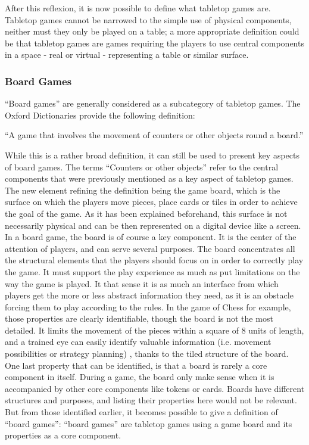 After this reflexion, it is now possible to define what tabletop games are. Tabletop games cannot be narrowed to the simple use of physical components, neither must they only be played on a table; a more appropriate definition could be that tabletop games are games requiring the players to use central components in a space - real or virtual - representing a table or similar surface.

\subsubsection{Board Games}

“Board games” are generally considered as a subcategory of tabletop games. The Oxford Dictionaries provide the following definition:

“A game that involves the movement of counters or other objects round a board.”

While this is a rather broad definition, it can still be used to present key aspects of board games. The terms “Counters or other objects” refer to the central components that were previously mentioned as a key aspect of tabletop games. The new element refining the definition being the game board, which is the surface on which the players move pieces, place cards or tiles in order to achieve the goal of the game. As it has been explained beforehand, this surface is not necessarily physical and can be then represented on a digital device like a screen. In a board game, the board is of course a key component. It is the center of the attention of players, and can serve several purposes. 
The board concentrates all the structural elements that the players should focus on in order to correctly play the game. It must support the play experience as much as put limitations on the way the game is played. It that sense it is as much an interface from which players get the more or less abstract information they need, as it is an obstacle forcing them to play according to the rules. In the game of Chess for example, those properties are clearly identifiable, though the board is not the most detailed. It limits the movement of the pieces within a square of 8 units of length, and a trained eye can easily identify valuable information (i.e. movement possibilities or strategy planning) , thanks to the tiled structure of the board. One last property that can be identified, is that a board is rarely a core component in itself. During a game, the board only make sense when it is accompanied by other core components like tokens or cards. Boards have different structures and purposes, and listing their properties here would not be relevant. But from those identified earlier, it becomes possible to give a definition of “board games”: “board games” are tabletop games using a game board and its properties as a core component.


